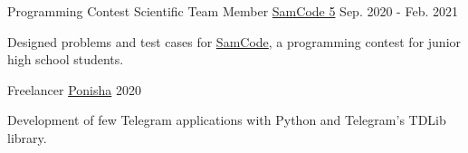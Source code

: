 \begin{cventries}
  \cventry
    {Programming Contest Scientific Team Member} %
    {\href{https://samcode.allamehelli3.ir/staff.html}{SamCode 5}} %
    {} %
    {Sep. 2020 - Feb. 2021} %
    {
      \begin{cvitems} %
        \item {Designed problems and test cases for {\href{https://samcode.allamehelli3.ir/}{SamCode}}, a programming contest for junior high school students.}
      \end{cvitems}
    }

  \cventry
    {Freelancer} %
    {\href{https://ponisha.ir/profile/radinshayanfar}{Ponisha}} %
    {} %
    {2020} %
    {
      \begin{cvitems} %
        \item {Development of few Telegram applications with Python and Telegram's TDLib library.}
      \end{cvitems}
    }

\end{cventries}


